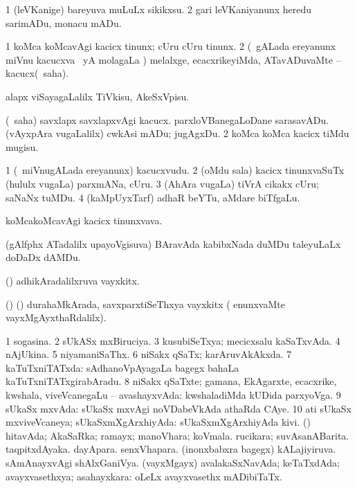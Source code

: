 \bentry
{}
\gl{\sakirx}
\bmng
\bnum
\num{1} (leVKanige) bareyuva muLuLx sikikxsu. 
\num{2} gari leVKaniyanunx heredu sarimADu, monacu mADu. 
\enum
\emng
\eentry

\bentry
{}
\gl{\sakirx}
\bmng
\bnum
\num{1} koMca koMcavAgi kacicx tinunx; cUru cUru tinunx. 
\num{2} (\kanmu\ gALada ereyanunx miVnu kacucxva \vi\ yA molagaLa \vi) melalxge, ecacxrikeyiMda, ATavADuvaMte -- kacucx(\akirx\ saha). 
\enum
\emng

\noindent
\gl{\akirx}
\bmng
alapx viSayagaLalilx TiVkisu, AkeSxVpisu. 
\emng

\noindent
\gl{\pagu}
\bmng
\bnum
{} (\rUpa\ saha) 
\banum
{} savxlapx savxlapxvAgi kacucx. 
 parxloVBanegaLoDane sarasavADu. 
 (vAyxpAra \mo vugaLalilx) cwkAsi mADu; jugAgxDu. 
\eanum
\numie
\num{2}  koMca koMca kacicx tiMdu mugisu. 
\enum
\emng
\eentry

\bentry
{}
\gl{\nA}
\bmng
\bnum
\num{1} (\kanmu\ miVnugALada ereyanunx) kacucxvudu. 
\num{2} (oMdu sala) kacicx tinunxvaSuTx (hululx \mo vugaLa) parxmANa, cUru. 
\num{3} (AhAra \mo vugaLa) tiVrA cikakx cUru; saNaNx tuMDu. 
\num{4} (kaMpUyxTarf) adhaR beYTu, aMdare  biTfgaLu. 
\enum
\emng
\eentry

\bentry
{}
\gl{\nA}
\bmng
koMcakoMcavAgi kacicx tinunxvava. 
\emng
\eentry

\bentry
{}
\gl{\nA}
\bmng
(gAlfphx ATadalilx upayoVgisuva) BAravAda kabibxNada duMDu taleyuLaLx doDaDx dAMDu. 
\emng
\eentry

\bentry
{}
\gl{\nA}
\bmng
(\ashi) adhikAradalilxruva vayxkitx. 
\emng

\noindent
\gl{\pagu}
\bmng
{}(\AmA) (\hA) durahaMkArada, savxparxtiSeThxya vayxkitx ( enunxvaMte vayxMgAyxthaRdalilx). 
\emng
\eentry

\bentry
{}
\gl{\gu}
\bmng
\bnum
\num{1} sogasina. 
\num{2} sUkASx mxBiruciya. 
\num{3} kusubiSeTxya; mecicxsalu kaSaTxvAda. 
\num{4} nAjUkina. 
\num{5} niyamaniSaThx. 
\num{6} niSakx qSaTx; karAruvAkAkxda. 
\num{7} kaTuTxniTATxda:  sAdhanoVpAyagaLa bagegx bahaLa kaTuTxniTATxgirabAradu. 
\num{8} niSakx qSaTxte; gamana, EkAgarxte, ecacxrike, kwshala, viveVcanegaLu -- avashayxvAda:  kwshaladiMda kUDida parxyoVga. 
\num{9} sUkaSx mxvAda:  sUkaSx mxvAgi noVDabeVkAda athaRda CAye. 
\num{10} ati sUkaSx mxviveVcaneya; sUkaSxmXgArxhiyAda:  sUkaSxmXgArxhiyAda kivi. 
 (\AmA) 
\banum
{} hitavAda; AkaSaRka; ramayx; manoVhara; koVmala. 
 rucikara; suvAsanABarita. 
 taqpitxdAyaka. 
 dayApara. 
 senxVhapara. 
 (inonxbabxra bagegx) kALajiyiruva. 
 sAmAnayxvAgi shAlxGaniVya. 
 (vayxMgayx) avalakaSxNavAda; keTaTxdAda; avayxvasethxya; asahayxkara:  oLeLx avayxvasethx mADibiTaTx. 
\eanum
\numie
\enum
\emng

